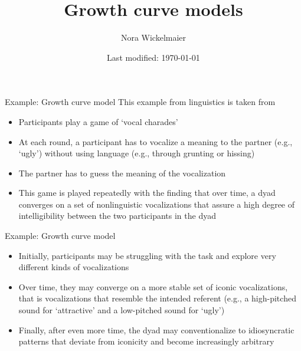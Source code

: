 \documentclass[aspectratio=169]{beamer}
\title{Growth curve models}
\author{Nora Wickelmaier}
\date{Last modified: \today}
\begin{document}
\begin{frame}{}
\thispagestyle{empty}
\titlepage
\end{frame}



\begin{frame}{Example: Growth curve model}
This example from linguistics is taken from \citet{Winter2016}\\[2ex]
\begin{itemize}
  \item Participants play a game of `vocal charades'
  \item At each round, a participant has to vocalize a meaning to the
  partner (e.g., `ugly') without using language (e.g., through grunting or
  hissing)
  \item The partner has to guess the meaning of the vocalization
  \item This game is played repeatedly with the finding that over time, a
  dyad converges on a set of nonlinguistic vocalizations that assure a high
  degree of intelligibility between the two participants in the dyad
\end{itemize}
\end{frame}


\begin{frame}{Example: Growth curve model}
\begin{itemize}
  \item Initially, participants may be struggling with the task and explore
  very different kinds of vocalizations
  \item Over time, they may converge on a more stable set of iconic
  vocalizations, that is vocalizations that resemble the intended referent
  (e.g., a high-pitched sound for `attractive' and a low-pitched sound for
  `ugly')
  \item Finally, after even more time, the dyad may conventionalize to
  idiosyncratic patterns that deviate from iconicity and become
  increasingly arbitrary
\end{itemize}
\end{frame}
\end{document}
